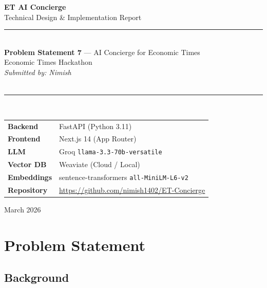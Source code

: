 \documentclass[12pt,a4paper]{article}
\begin{document}
\begin{titlepage}
\centering
\vspace*{2cm}

{\Huge\bfseries\color{etOrange} ET AI Concierge}\\[0.5em]
{\Large\color{etSlate} Technical Design \& Implementation Report}\\[2em]

\rule{12cm}{1.5pt}\\[1.5em]

{\large\textbf{Problem Statement 7} — AI Concierge for Economic Times}\\[1em]
{\normalsize\color{etMuted}
Economic Times Hackathon\\
\textit{Submitted by: Nimish}\\
}\\[1em]

\rule{12cm}{0.5pt}\\[2em]

{\normalsize
\begin{tabular}{ll}
\textbf{Backend}   & FastAPI (Python 3.11) \\
\textbf{Frontend}  & Next.js 14 (App Router) \\
\textbf{LLM}       & Groq \texttt{llama-3.3-70b-versatile} \\
\textbf{Vector DB} & Weaviate (Cloud / Local) \\
\textbf{Embeddings}& sentence-transformers \texttt{all-MiniLM-L6-v2} \\
\textbf{Repository}& \url{https://github.com/nimish1402/ET-Concierge} \\
\end{tabular}
}

\vfill
{\small\textcolor{etMuted}{March 2026}}
\end{titlepage}

\tableofcontents
\newpage

\section{Problem Statement}

\subsection{Background}
\end{document}
